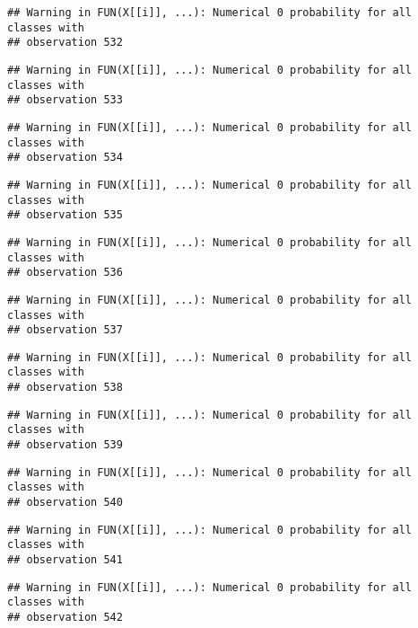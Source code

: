 \documentclass[
]{article}
\begin{document}
\begin{verbatim}
## Warning in FUN(X[[i]], ...): Numerical 0 probability for all classes with
## observation 532
\end{verbatim}

\begin{verbatim}
## Warning in FUN(X[[i]], ...): Numerical 0 probability for all classes with
## observation 533
\end{verbatim}

\begin{verbatim}
## Warning in FUN(X[[i]], ...): Numerical 0 probability for all classes with
## observation 534
\end{verbatim}

\begin{verbatim}
## Warning in FUN(X[[i]], ...): Numerical 0 probability for all classes with
## observation 535
\end{verbatim}

\begin{verbatim}
## Warning in FUN(X[[i]], ...): Numerical 0 probability for all classes with
## observation 536
\end{verbatim}

\begin{verbatim}
## Warning in FUN(X[[i]], ...): Numerical 0 probability for all classes with
## observation 537
\end{verbatim}

\begin{verbatim}
## Warning in FUN(X[[i]], ...): Numerical 0 probability for all classes with
## observation 538
\end{verbatim}

\begin{verbatim}
## Warning in FUN(X[[i]], ...): Numerical 0 probability for all classes with
## observation 539
\end{verbatim}

\begin{verbatim}
## Warning in FUN(X[[i]], ...): Numerical 0 probability for all classes with
## observation 540
\end{verbatim}

\begin{verbatim}
## Warning in FUN(X[[i]], ...): Numerical 0 probability for all classes with
## observation 541
\end{verbatim}

\begin{verbatim}
## Warning in FUN(X[[i]], ...): Numerical 0 probability for all classes with
## observation 542
\end{verbatim}
\end{document}
